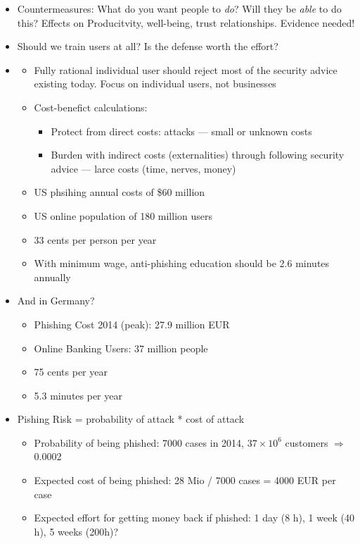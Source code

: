 \documentclass[a4paper,12pt]{scrartcl}
\begin{document}
\begin{itemize}
\begin{itemize}
		\end{itemize}
	\item
		Countermeasures: What do you want people to \emph{do}? Will they be \emph{able} to do this? Effects on Producitvity, well-being, trust relationships. Evidence needed!
	\item
		Should we train users at all? Is the defense worth the effort?
	\item
		\begin{itemize}
			\item
				Fully rational individual user should reject most of the security advice existing today. Focus on individual users, not businesses
			\item
				Cost-benefict calculations:
				\begin{itemize}
					\item
						Protect from direct costs: attacks --- small or unknown costs
					\item
						Burden with indirect costs (externalities) through following security advice --- larce costs (time, nerves, money)
				\end{itemize}
			\item
				US phsihing annual costs of \$60 million
			\item
				US online population of 180 million users
			\item
				33 cents per person per year
			\item
				With minimum wage, anti-phishing education should be 2.6 minutes annually
		\end{itemize}
	\item
		And in Germany?
		\begin{itemize}
			\item
				Phishing Cost 2014 (peak): 27.9 million EUR
			\item
				Online Banking Users: 37 million people
			\item
				75 cents per year
			\item
				5.3 minutes per year
		\end{itemize}
	\item
		Pishing Risk = probability of attack * cost of attack
		\begin{itemize}
			\item
				Probability of being phished: 7000 cases in 2014, $37\times10^6$ customers $\Rightarrow$ 0.0002
			\item
				Expected cost of being phished: 28 Mio / 7000 cases = 4000 EUR per case
			\item
				Expected effort for getting money back if phished: 1 day (8 h), 1 week (40 h), 5 weeks (200h)?


\end{itemize}
\end{itemize}
\end{document}
